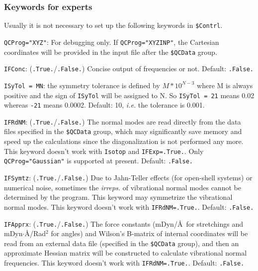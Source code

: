 \documentclass[12pt,english]{extarticle}
\begin{document}
\subsubsection{Keywords for experts} \label{subsec:inp-qcdata-expert}

Usually it is not necessary to set up the following keywords in \texttt{\$Contrl}.

\bigskip{}\bigskip{}
\verb|QCProg="XYZ"|: For debugging only. If \verb|QCProg="XYZINP"|, the Cartesian coordinates will be provided in the input file after the \texttt{\$QCData} group.

\bigskip{}\bigskip{}
\verb|IFConc|: (\verb|.True.|/\verb|.False.|) Concise output of frequencies or not. Default: \verb|.False.|

\bigskip{}\bigskip{}
\verb|ISyTol = MN|: the symmetry tolerance is defined by $M*10^{N-3}$ where M
is always positive and the sign of \verb|ISyTol| will be assigned to N. So
\verb|ISyTol = 21| means 0.02 whereas \verb|-21| means 0.0002. Default: 10, \emph{i.e.} the tolerance is 0.001.

\bigskip{}\bigskip{}
\verb|IFRdNM|: (\verb|.True.|/\verb|.False.|) The normal modes are read directly from the data files specified in the \texttt{\$QCData} group, which may significantly save memory and speed up the calculations since the diagonalization is not performed any more. This keyword
doesn't work with \verb|Isotop| and \verb|IFExp=.True.|. Only \verb|QCProg="Gaussian"| is supported at present. Default: \verb|.False.|

\bigskip{}\bigskip{}
\verb|IFSymtz|: (\verb|.True.|/\verb|.False.|) Due to Jahn-Teller effects (for open-shell systems) or numerical noise, sometimes the \textit{irreps.} of vibrational normal modes cannot be determined by the program. This keyword may symmetrize the vibrational normal modes.
This keyword doesn't work with \verb|IFRdNM=.True.|. Default: \verb|.False.|

\bigskip{}
\verb|IFApprx|: (\verb|.True.|/\verb|.False.|) The force constants (mDyn/\AA ~for stretchings and mDyn$\cdot$\AA/Rad$^2$ for angles) and Wilson's B-matrix of internal coordinates will be read from an external data file (specified in the \texttt{\$QCData} group), and then an approximate Hessian matrix will be constructed to calculate vibrational normal frequencies.  This keyword
doesn't work with \verb|IFRdNM=.True.|. Default: \verb|.False.|
\end{document}
